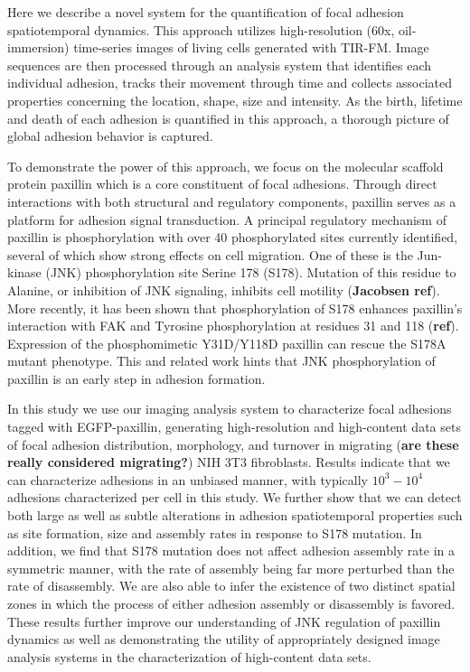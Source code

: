 \documentclass[10pt]{article}
\begin{document}
Here we describe a novel system for the quantification of focal adhesion
spatiotemporal dynamics. This approach utilizes high-resolution (60x,
oil-immersion) time-series images of living cells generated with TIR-FM. Image
sequences are then processed through an analysis system that identifies each
individual adhesion, tracks their movement through time and collects associated
properties concerning the location, shape, size and intensity. As the birth,
lifetime and death of each adhesion is quantified in this approach, a thorough
picture of global adhesion behavior is captured.

To demonstrate the power of this approach, we focus on the molecular scaffold
protein paxillin which is a core constituent of focal adhesions. Through direct
interactions with both structural and regulatory components, paxillin serves as
a platform for adhesion signal transduction. A principal regulatory mechanism of
paxillin is phosphorylation with over 40 phosphorylated sites currently
identified, several of which show strong effects on cell migration. One of these
is the Jun-kinase (JNK) phosphorylation site Serine 178 (S178). Mutation of this
residue to Alanine, or inhibition of JNK signaling, inhibits cell motility
(\textbf{Jacobsen ref}).  More recently, it has been shown that phosphorylation of S178
enhances paxillin's interaction with FAK and Tyrosine phosphorylation at
residues 31 and 118 (\textbf{ref}). Expression of the phosphomimetic Y31D/Y118D paxillin
can rescue the S178A mutant phenotype. This and related work hints that JNK
phosphorylation of paxillin is an early step in adhesion formation. 

In this study we use our imaging analysis system to characterize focal adhesions
tagged with EGFP-paxillin, generating high-resolution and high-content data sets
of focal adhesion distribution, morphology, and turnover in migrating
(\textbf{are these really considered migrating?}) NIH 3T3 fibroblasts. Results
indicate that we can characterize adhesions in an unbiased manner, with
typically $10^3-10^4$ adhesions characterized per cell in this study. We further
show that we can detect both large as well as subtle alterations in adhesion
spatiotemporal properties such as site formation, size and assembly rates in
response to S178 mutation. In addition, we find that S178 mutation does not
affect adhesion assembly rate in a symmetric manner, with the rate of assembly
being far more perturbed than the rate of disassembly. We are also able to infer
the existence of two distinct spatial zones in which the process of either
adhesion assembly or disassembly is favored. These results further improve our
understanding of JNK regulation of paxillin dynamics as well as demonstrating
the utility of appropriately designed image analysis systems in the
characterization of high-content data sets. 
\end{document}
